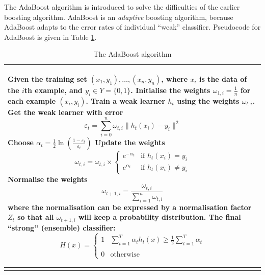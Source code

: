 The AdaBoost algorithm is introduced to solve the difficulties of the earlier boosting algorithm. AdaBoost is an \textit{adaptive} boosting algorithm, because AdaBoost adapts to the error rates of individual ``weak'' classifier. Pseudocode for AdaBoost is given in \mbox{Table} \ref{tab:adaboost}. 
\begin{table}
\caption{The AdaBoost algorithm}

\begin{tabular}{p{\columnwidth}}
\hline
 \begin{algorithmic}[1]
\STATE Given the training set $(x_{1},y_{1}),\ldots,(x_{n},y_{n})$, where $x_{i}$ is the data of the $i$th example, and $y_{i} \in Y=\{0,1\}$.
\STATE Initialise the weights $\omega_{1,i}=\frac{1}{n}$ for each example $(x_{i},y_{i})$.
\FOR{$t=1,\ldots,T$}
	\STATE Train a weak learner $h_{t}$ using the weights $\omega_{t,i}$.
	\STATE Get the weak learner with error 
                       \begin{equation}\label{eq:error}
                        \varepsilon_{t} =\sum_{i=0}^{n}\omega_{t,i}\|h_{t}(x_{i})-y_{i}\|^2
                       \end{equation}
	\STATE Choose $\alpha_{t}=\frac{1}{2}\ln \left( \frac{1-\varepsilon_{t}}{\varepsilon_{t}} \right)$
	\STATE Update the weights 
		\begin{equation}\label{eq:update}
		 \omega_{t,i} = \omega_{t,i} \times
                 \left\{
		  \begin{array}{ll}
		                                            e^{-\alpha_{t}} & \textrm{if $h_{t}(x_{i})=y_{i}$} \\
						           e^{\alpha_{t}} & \textrm{if $h_{t}(x_{i}) \neq y_{i}$}
		  \end{array}
		\right.
		\end{equation}
	\STATE Normalise the weights 
		\begin{equation}\label{eq:normalisation}
		  \omega_{t+1,i} = \frac{\omega_{t,i}}{\sum_{i=1}^{n}\omega_{t,i}}
		\end{equation}
	where the normalisation can be expressed by a normalisation factor $Z_{t}$ so that all $ \omega_{t+1,i}$ will keep a probability distribution.
\ENDFOR
\STATE The final ``strong'' (ensemble) classifier:
	\begin{equation}
	 H(x)  = 
		\left\{
		 \begin{array}{ll}
		  1 & \sum_{t=1}^{T}\alpha_{t}h_{t}(x) \geq \frac{1}{2}\sum_{t=1}^{T}\alpha_{t}\\
			\\
		  0 & \textrm{otherwise}
		 \end{array}
		\right. 
	\end{equation}
\end{algorithmic}\\
\hline
\label{tab:adaboost}
\end{tabular}
\end{table} 

